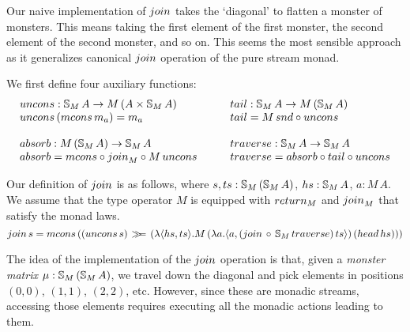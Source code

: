 Our naive implementation of $\join$ takes the `diagonal' to flatten a monster of monsters. This means taking the first element of the first monster, the second element of the second monster, and so on. 
This seems the most sensible approach as it generalizes canonical $\join$ operation of the pure stream monad.

We first define four auxiliary functions:
$$
\begin{array}{l}
\uncons : \stream{M}\,A \rightarrow M\,(A \times \stream{M}\,A)\\
\uncons\, (\mcons\, m_a) = m_a \\
\,\\
\mathsf{absorb} : M\,(\stream{M}\,A) \rightarrow \stream{M}\,A \\
\mathsf{absorb} =  \mcons \comp \join_{M} \comp M\,\uncons \\
\end{array}
  \qquad
\begin{array}{l}
\tail : \stream{M}\,A \rightarrow M\,(\stream{M}\,A)\\
\tail = M\,\snd \comp \uncons\\
\,\\
\mathsf{traverse} : \stream{M}\,A \rightarrow \stream{M}\,A \\
\mathsf{traverse} = \mathsf{absorb} \comp \tail \comp \uncons
\end{array}
$$

Our definition of $\join$ is as follows, where $s, ts : \mathbb{S}_{M}\,(\mathbb{S}_{M}\, A)$, 
$hs : \mathbb{S}_{M}\, A$, $a : M\, A$. We assume that the type operator $M$ is equipped with $\return_M$ and $\join_M$ that satisfy the monad laws.
$$
\join\, s = \mcons\, ((\uncons\, s) \, \bind \,(\lambda \pair{hs}{ts} . M\,(\lambda a . \pair{a}{(\join\, \comp\, \stream{M}\,\mathsf{traverse})\, ts})\, (\head\, hs)))
$$


The idea of the implementation of the $\join$ operation is that,
given a {\em monster matrix} $\mu:\mathbb{S}_{M}\,(\mathbb{S}_{M}\,A)$, we travel down the diagonal and pick elements in positions $(0,0)$, $(1,1)$, $(2,2)$, etc.
However, since these are monadic streams, accessing those elements requires executing all the monadic actions leading to them.

